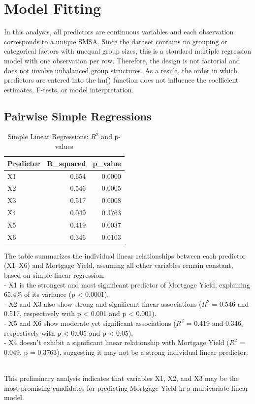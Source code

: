 \documentclass[
  11pt,
]{article}
\begin{document}
\section{Model Fitting}\label{model-fitting}

In this analysis, all predictors are continuous variables and each
observation corresponds to a unique SMSA. Since the dataset contains no
grouping or categorical factors with unequal group sizes, this is a
standard multiple regression model with one observation per row.
Therefore, the design is not factorial and does not involve unbalanced
group structures. As a result, the order in which predictors are entered
into the lm() function does not influence the coefficient estimates,
F-tests, or model interpretation.

\subsection{Pairwise Simple
Regressions}\label{pairwise-simple-regressions}

\begingroup\fontsize{8}{10}\selectfont

\begin{longtable}[t]{lrr}
\caption{\label{tab:unnamed-chunk-8}Simple Linear Regressions: $R^2$ and p-values}\\
\toprule
Predictor & R\_squared & p\_value\\
\midrule
X1 & 0.654 & 0.0000\\
X2 & 0.546 & 0.0005\\
X3 & 0.517 & 0.0008\\
X4 & 0.049 & 0.3763\\
X5 & 0.419 & 0.0037\\
\addlinespace
X6 & 0.346 & 0.0103\\
\bottomrule
\end{longtable}
\endgroup{}

The table summarizes the individual linear relationships between each
predictor (X1--X6) and Mortgage Yield, assuming all other variables
remain constant, based on simple linear regression.\\
- X1 is the strongest and most significant predictor of Mortgage Yield,
explaining 65.4\% of its variance (p \textless{} 0.0001).\\
- X2 and X3 also show strong and significant linear associations
(\(R^2\) = 0.546 and 0.517, respectively with p \textless{} 0.001 and p
\textless{} 0.001).\\
- X5 and X6 show moderate yet significant associations (\(R^2\) = 0.419
and 0.346, respectively with p \textless{} 0.005 and p \textless{}
0.05).\\
- X4 doesn't exhibit a significant linear relationship with Mortgage
Yield (\(R^2\) = 0.049, p = 0.3763), suggesting it may not be a strong
individual linear predictor.\\
\strut \\
This preliminary analysis indicates that variables X1, X2, and X3 may be
the most promising candidates for predicting Mortgage Yield in a
multivariate linear model.
\end{document}
